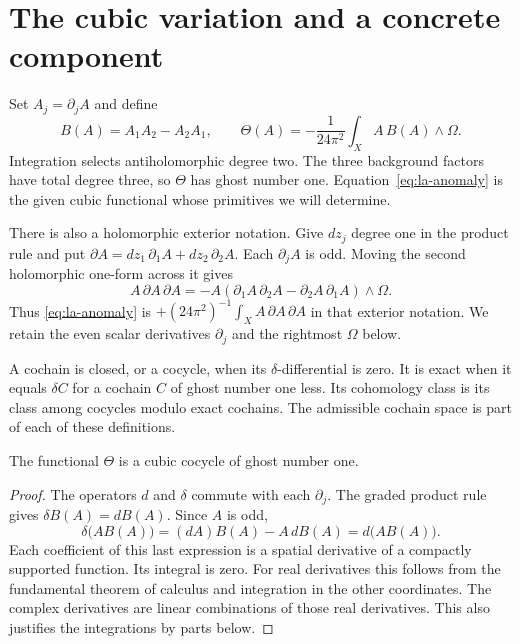 \section{The cubic variation and a concrete component}
\label{sec:la-cubic}

Set $A_j=\partial_jA$ and define
\begin{equation}\label{eq:la-anomaly}
 B(A)=A_1A_2-A_2A_1,\qquad
 \Theta(A)=-\frac1{24\pi^2}
       \int_X A\,B(A)\wedge\Omega.
\end{equation}
Integration selects antiholomorphic degree two. The three
background factors have total degree three, so $\Theta$ has
ghost number one. Equation~\eqref{eq:la-anomaly} is the given
cubic functional whose primitives we will determine.

There is also a holomorphic exterior notation. Give $dz_j$
degree one in the product rule and put
$\partial A=dz_1\,\partial_1A+dz_2\,\partial_2A$.
Each $\partial_jA$ is odd. Moving the second holomorphic
one-form across it gives
\[
 A\,\partial A\,\partial A
 =-A(\partial_1A\,\partial_2A-\partial_2A\,\partial_1A)
       \wedge\Omega.
\]
Thus \eqref{eq:la-anomaly} is
$+(24\pi^2)^{-1}\int_X A\,\partial A\,\partial A$
in that exterior notation. We retain the even scalar
derivatives $\partial_j$ and the rightmost $\Omega$ below.

A cochain is closed, or a cocycle, when its $\delta$-differential
is zero. It is exact when it equals $\delta C$ for a cochain
$C$ of ghost number one less. Its cohomology class is its class
among cocycles modulo exact cochains. The admissible cochain
space is part of each of these definitions.

\begin{proposition}\label{prop:la-closed}
The functional $\Theta$ is a cubic cocycle of ghost number one.
\end{proposition}
\begin{proof}
The operators $d$ and $\delta$ commute with each $\partial_j$.
The graded product rule gives $\delta B(A)=dB(A)$. Since $A$
is odd,
\[
 \delta\bigl(A B(A)\bigr)
   =(dA)B(A)-A\,dB(A)=d\bigl(A B(A)\bigr).
\]
Each coefficient of this last expression is a spatial derivative
of a compactly supported function. Its integral is zero.
For real derivatives this follows from the fundamental theorem
of calculus and integration in the other coordinates.
The complex derivatives are linear combinations of those real
derivatives. This also justifies the integrations by parts below.
\end{proof}

